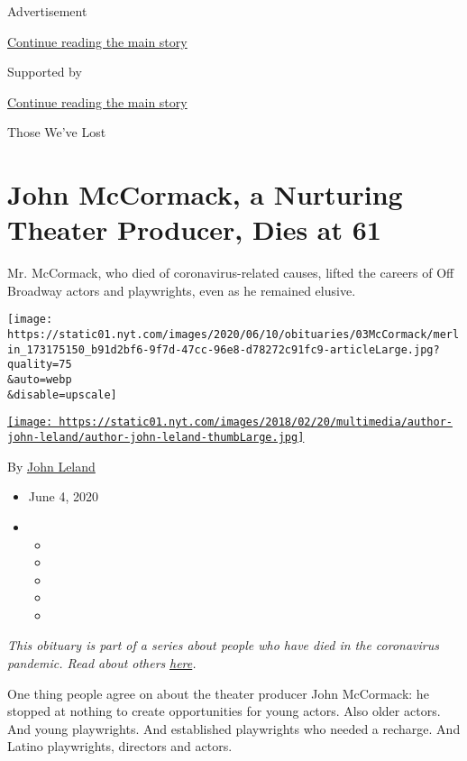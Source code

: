 Advertisement

\protect\hyperlink{after-top}{Continue reading the main story}

Supported by

\protect\hyperlink{after-sponsor}{Continue reading the main story}

Those We've Lost

\hypertarget{john-mccormack-a-nurturing-theater-producer-dies-at-61}{%
\section{John McCormack, a Nurturing Theater Producer, Dies at
61}\label{john-mccormack-a-nurturing-theater-producer-dies-at-61}}

Mr. McCormack, who died of coronavirus-related causes, lifted the
careers of Off Broadway actors and playwrights, even as he remained
elusive.

\texttt{[image: https://static01.nyt.com/images/2020/06/10/obituaries/03McCormack/merlin\_173175150\_b91d2bf6-9f7d-47cc-96e8-d78272c91fc9-articleLarge.jpg?quality=75\\\&auto=webp\\\&disable=upscale]}

\href{https://www.nytimes.com/by/john-leland}{\texttt{[image: https://static01.nyt.com/images/2018/02/20/multimedia/author-john-leland/author-john-leland-thumbLarge.jpg]}}

By \href{https://www.nytimes.com/by/john-leland}{John Leland}

\begin{itemize}
\item
  June 4, 2020
\item
  \begin{itemize}
  \item
  \item
  \item
  \item
  \item
  \end{itemize}
\end{itemize}

\emph{This obituary is part of a series about people who have died in
the coronavirus pandemic. Read about others}
\href{https://www.nytimes.com/interactive/2020/obituaries/people-died-coronavirus-obituaries.html}{\emph{here}}\emph{.}

One thing people agree on about the theater producer John McCormack: he
stopped at nothing to create opportunities for young actors. Also older
actors. And young playwrights. And established playwrights who needed a
recharge. And Latino playwrights, directors and actors.

